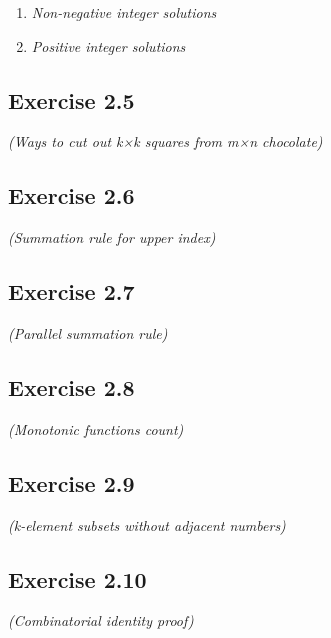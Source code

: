\documentclass[12pt,a4paper]{article}
\begin{document}
\begin{enumerate}[label=(\roman*)]
\item \textit{Non-negative integer solutions}
\vspace{1cm}

\item \textit{Positive integer solutions}
\vspace{1cm}
\end{enumerate}

\subsection*{Exercise 2.5}
\textit{(Ways to cut out k×k squares from m×n chocolate)}

\vspace{1cm}

\subsection*{Exercise 2.6}
\textit{(Summation rule for upper index)}

\vspace{1cm}

\subsection*{Exercise 2.7}
\textit{(Parallel summation rule)}

\vspace{1cm}

\subsection*{Exercise 2.8}
\textit{(Monotonic functions count)}

\vspace{1cm}

\subsection*{Exercise 2.9}
\textit{(k-element subsets without adjacent numbers)}

\vspace{1cm}

\subsection*{Exercise 2.10}
\textit{(Combinatorial identity proof)}
\end{document}
